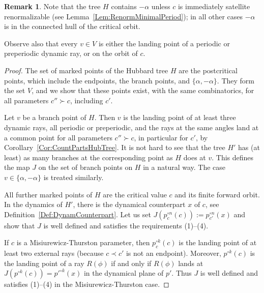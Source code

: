 \documentclass[12pt]{amsart}
\newcommand{\0}{\texttt{0}}
\newcommand{\1}{\texttt{1}}
\theoremstyle{definition}
\newtheorem*{remark}{Remark}
\numberwithin{equation}{section}
\begin{document}
\begin{remark}
Note that the tree $H$ contains $-\alpha$ unless $c$ is immediately satellite renormalizable (see Lemma~\ref{Lem:RenormMinimalPeriod}); in all other cases $-\alpha$ is in the connected hull of the critical orbit. 

Observe also that every $v\in V$ is either the landing point of a periodic or preperiodic dynamic ray, or on the orbit of $c$.
\end{remark}


\begin{proof}
The set of marked points of the Hubbard tree $H$ are the postcritical points, which include the endpoints, the branch points,  and $\{\alpha, -\alpha\}$. They form the set $V$, and we show that these points exist, with the same combinatorics, for all parameters $c''\succ c$, including $c'$. 

Let $v$ be a branch point of $H$. Then $v$ is the landing point of at least three dynamic rays, all periodic or preperiodic, and the rays at the same angles land at a common point for all parameters $c''\succ c$, in particular for $c'$, by Corollary~\ref{Cor:CountPartsHubTree}. It is not hard to see that the tree $H'$ has (at least) as many branches at the corresponding point as $H$ does at $v$. This defines the map $J$ on the set of branch points on $H$ in a natural way.  The case $v\in\{\alpha, -\alpha\}$ is treated similarly.


All further marked points of $H$ are the critical value $c$ and its finite forward orbit. In the dynamics of $H'$, there is the dynamical counterpart $x$ of $c$, see Definition~\ref{Def:DynamCounterpart}. Let us set $J(p_c^{\circ n}(c)):=p_{c'}^{\circ n}(x)$ and show that $J$ is well defined and satisfies the requirements (1)--(4). 


If $c$ is a Misiurewicz-Thurston parameter, then $p^{\circ k}_c(c)$ is the landing point of at least two external rays (because $c\prec c'$ is not an endpoint). Moreover, $p^{\circ k}(c)$ is the landing point of a ray $R(\phi)$ if and only if $R(\phi)$ lands at $J(p^{\circ k}(c))=p'^{\circ k}(x)$ in the dynamical plane of $p'$. Thus $J$ is well defined and satisfies (1)--(4) in the Misiurewicz-Thurston case.



\end{proof}
\end{document}
